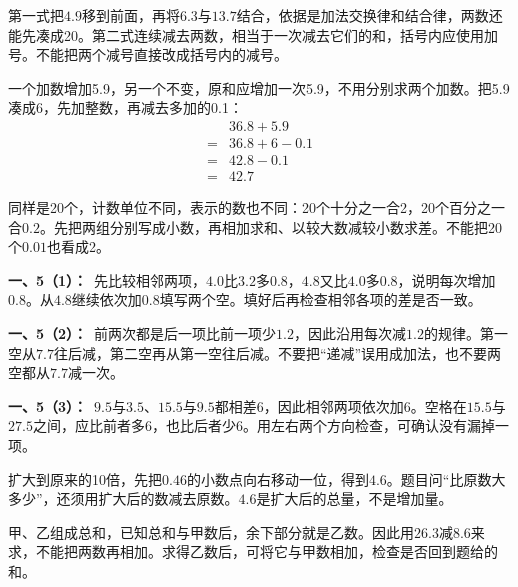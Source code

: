 \documentclass[multi=snippet,border=0pt]{standalone}
\newenvironment{snippet}[3]{\begin{minipage}{#1bp}\color{answerred}\fontsize{#2}{#3}\selectfont\raggedright}{\end{minipage}}
\begin{document}
\begin{snippet}{505}{11.5}{14}第一式把\(4.9\)移到前面，再将\(6.3\)与\(13.7\)结合，依据是加法交换律和结合律，两数还能先凑成20。第二式连续减去两数，相当于一次减去它们的和，括号内应使用加号。不能把两个减号直接改成括号内的减号。\end{snippet}
\begin{snippet}{505}{11.5}{14}一个加数增加5.9，另一个不变，原和应增加一次5.9，不用分别求两个加数。把5.9凑成6，先加整数，再减去多加的0.1：\[\begin{aligned}&36.8+5.9\\={}&36.8+6-0.1\\={}&42.8-0.1\\={}&42.7\end{aligned}\]\end{snippet}
\begin{snippet}{505}{11.5}{14}同样是20个，计数单位不同，表示的数也不同：20个十分之一合2，20个百分之一合\(0.2\)。先把两组分别写成小数，再相加求和、以较大数减较小数求差。不能把20个\(0.01\)也看成2。\end{snippet}
\begin{snippet}{505}{11.5}{14}\textbf{一、5（1）：}\ 先比较相邻两项，\(4.0\)比\(3.2\)多\(0.8\)，\(4.8\)又比\(4.0\)多\(0.8\)，说明每次增加\(0.8\)。从\(4.8\)继续依次加\(0.8\)填写两个空。填好后再检查相邻各项的差是否一致。\end{snippet}
\begin{snippet}{505}{11.5}{14}\textbf{一、5（2）：}\ 前两次都是后一项比前一项少\(1.2\)，因此沿用每次减\(1.2\)的规律。第一空从\(7.7\)往后减，第二空再从第一空往后减。不要把“递减”误用成加法，也不要两空都从\(7.7\)减一次。\end{snippet}
\begin{snippet}{505}{11.5}{14}\textbf{一、5（3）：}\ \(9.5\)与\(3.5\)、\(15.5\)与\(9.5\)都相差6，因此相邻两项依次加6。空格在\(15.5\)与\(27.5\)之间，应比前者多6，也比后者少6。用左右两个方向检查，可确认没有漏掉一项。\end{snippet}
\begin{snippet}{505}{11.5}{14}扩大到原来的10倍，先把\(0.46\)的小数点向右移动一位，得到\(4.6\)。题目问“比原数大多少”，还须用扩大后的数减去原数。\(4.6\)是扩大后的总量，不是增加量。\end{snippet}
\begin{snippet}{505}{11.5}{14}甲、乙组成总和，已知总和与甲数后，余下部分就是乙数。因此用\(26.3\)减\(8.6\)来求，不能把两数再相加。求得乙数后，可将它与甲数相加，检查是否回到题给的和。\end{snippet}
\end{document}
